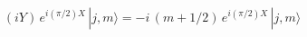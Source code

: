 \begin{equation}
\left( i Y\right) \,e^{i({\pi}/{2})X}\,|j,m\rangle=	
	-i\,(m+{1}/{2} )\,e^{i({\pi}/{2})X}\,  |j,m\rangle 
\label{eq:lastar}
\end{equation}

